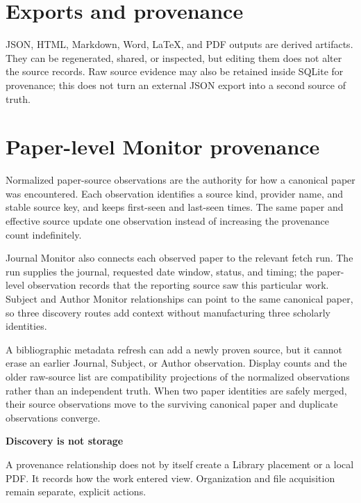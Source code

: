\documentclass[10pt,letterpaper,oneside]{scrreprt}
\renewenvironment{quote}
  {\Needspace{5\baselineskip}\begin{tcolorbox}[enhanced,breakable,colback=GewuPale,colframe=GewuPale,boxrule=0pt,
    borderline west={1.6pt}{0pt}{GewuBlue},arc=1.2mm,left=2.5mm,right=2.5mm,top=1.7mm,bottom=1.7mm,
    before skip=4pt,after skip=5pt,fontupper=\color{GewuInk}\small]}
  {\end{tcolorbox}}
\begin{document}
\section{Exports and provenance}\label{exports-and-provenance}

JSON, HTML, Markdown, Word, LaTeX, and PDF outputs are derived artifacts. They can be regenerated, shared, or inspected, but editing them does not alter the source records. Raw source evidence may also be retained inside SQLite for provenance; this does not turn an external JSON export into a second source of truth.

\section{Paper-level Monitor provenance}\label{paper-level-monitor-provenance}

Normalized paper-source observations are the authority for how a canonical paper was encountered. Each observation identifies a source kind, provider name, and stable source key, and keeps first-seen and last-seen times. The same paper and effective source update one observation instead of increasing the provenance count indefinitely.

Journal Monitor also connects each observed paper to the relevant fetch run. The run supplies the journal, requested date window, status, and timing; the paper-level observation records that the reporting source saw this particular work. Subject and Author Monitor relationships can point to the same canonical paper, so three discovery routes add context without manufacturing three scholarly identities.

A bibliographic metadata refresh can add a newly proven source, but it cannot erase an earlier Journal, Subject, or Author observation. Display counts and the older raw-source list are compatibility projections of the normalized observations rather than an independent truth. When two paper identities are safely merged, their source observations move to the surviving canonical paper and duplicate observations converge.

\begin{quote}
\textbf{Discovery is not storage}

A provenance relationship does not by itself create a Library placement or a local PDF. It records how the work entered view. Organization and file acquisition remain separate, explicit actions.
\end{quote}
\end{document}
